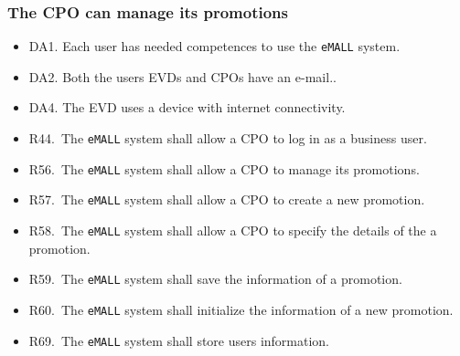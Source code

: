 \subsubsection{The CPO can manage its promotions}
\begin{itemize}
    \item DA1. Each user has needed competences to use the \verb|eMALL| system.
    \item DA2. Both the users EVDs and CPOs have an e-mail..
    \item DA4. The EVD uses a device with internet connectivity.
    \item R44.\ The \verb|eMALL| system shall allow a CPO to log in as a business user.
    \item R56.\ The \verb|eMALL| system shall allow a CPO to manage its promotions.
    \item R57.\ The \verb|eMALL| system shall allow a CPO to create a new promotion.
    \item R58.\ The \verb|eMALL| system shall allow a CPO to specify the details of the a promotion.
    \item R59.\ The \verb|eMALL| system shall save the information of a promotion.
    \item R60.\ The \verb|eMALL| system shall initialize the information of a new promotion.
    \item R69.\ The \verb|eMALL| system shall store users information.
\end{itemize}

